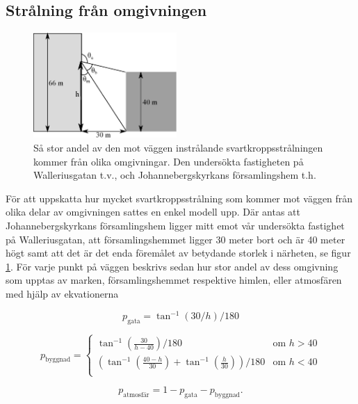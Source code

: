 \subsection{Strålning från omgivningen}
\label{sec:bb_sur}

\begin{figure}[hpbt]
\centering
\includegraphics[height=4cm]{images/blackbody_surroundings.eps}
\caption{\label{fig:surroundings}{Så stor andel av den mot väggen instrålande 
svartkroppsstrålningen kommer från olika omgivningar. Den undersökta fastigheten på 
Walleriusgatan t.v., och Johannebergskyrkans församlingshem t.h.}}
\end{figure}

För att uppskatta hur mycket svartkroppsstrålning som kommer mot väggen från olika 
delar av omgivningen sattes en enkel modell upp. Där antas att Johannebergskyrkans 
församlingshem ligger mitt emot vår undersökta fastighet på Walleriusgatan, att 
församlingshemmet ligger 30 meter bort och är 40 meter högt samt att det är det enda 
föremålet av betydande storlek i närheten, se figur \ref{fig:surroundings}. För varje punkt
 på väggen beskrivs sedan hur stor andel av dess omgivning som upptas av marken, 
 församlingshemmet respektive himlen, eller atmosfären med hjälp av ekvationerna

\begin{equation}
p_\text{gata}=\tan^{-1}(30/h)/180
\end{equation}

\begin{equation}
p_\text{byggnad}= \left\{
\begin{array}{rl}
\tan^{-1}(\frac{30}{h-40})/180 & \text{om } h > 40 \\
(\tan^{-1}(\frac{40-h}{30})+\tan^{-1}(\frac{h}{30}))/180 & \text{om } h < 40 \\
\end{array} \right.
\end{equation}

\begin{equation}
p_\text{atmosfär}=1-p_\text{gata}-p_\text{byggnad}.
\end{equation}

